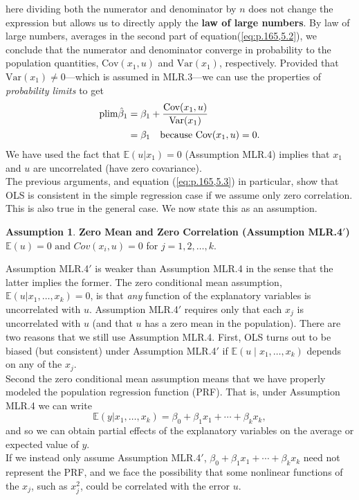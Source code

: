 \documentclass[a4paper, 10pt]{article}
\theoremstyle{definition}	%
\newtheorem{assumption}{Assumption}
\begin{document}
here dividing both the numerator and denominator by $n$ does not change the expression
but allows us to directly apply the \textbf{law of large numbers}. By law of large numbers, 
averages in the second part of equation(\ref{eq:p.165,5.2}), we conclude that the numerator
and denominator converge in probability to the population quantities, $\text{Cov}(x_1, u)$ and $\text{Var}(x_1)$, respectively. Provided that $\text{Var}(x_1) \neq 0$—which is assumed in MLR.3—we can use the properties of \textit{probability limits} to get 
\begin{align}
    \text{plim} \hat{\beta}_1 &= \beta_1 + \frac{\text{Cov}(x_1, u)}{\text{Var}(x_1)} \notag\\
    &= \beta_1 \quad \text{because Cov}(x_1, u) = 0. \label{eq:p.165,5.3}
\end{align}                                                                                                                                                            
We have used the fact that $\mathbb{E}(u|x_1) = 0$ (Assumption MLR.4) implies 
that $x_1$ and $u$ are uncorrelated (have zero covariance).\\
The previous arguments, and equation (\ref{eq:p.165,5.3}) in particular, show that OLS is consistent in the simple regression case if we assume only zero correlation. This is also true in the general case. We now state this as an assumption.
\begin{assumption}
    \textbf{Zero Mean and Zero Correlation (Assumption MLR.4$'$)}\\
    $\mathbb{E}(u) = 0 \text{ and } Cov(x_i,u) = 0$ for $ j = 1, 2, \ldots, k $.
\end{assumption}
Assumption MLR.4$'$ is weaker than Assumption MLR.4 in the sense that the latter implies the former. The zero conditional mean assumption, $\mathbb{E}(u|x_1, \ldots, x_k) = 0$, is that \textit{any} function of the explanatory variables is uncorrelated with $u$. Assumption MLR.4$'$ requires only that each $x_j$ is uncorrelated with $u$ (and that $u$ has a zero mean in the population). There are two reasons that we still use Assumption MLR.4. First, OLS turns out to be biased (but consistent) under Assumption MLR.4$'$ if $\mathbb{E}(u \mid x_1, \ldots, x_k)$ depends on any of the $x_j$.\\
Second the zero conditional mean assumption means that we have properly modeled the population regression function (PRF). That is, under Assumption MLR.4 we can write
\begin{equation*}
    \mathbb{E}(y|x_1, \ldots, x_k) = \beta_0 + \beta_1 x_1 + \cdots + \beta_k x_k,
\end{equation*}
and so we can obtain partial effects of the explanatory variables on the average or expected value of $y$.\\
If we instead only assume Assumption MLR.4$'$, $\beta_0 + \beta_1 x_1 + \cdots + \beta_k x_k$ need not represent the PRF, and we face the possibility that some nonlinear functions of the $x_j$, such as $x_j^2$, could be correlated with the error $u$. 
\end{document}
